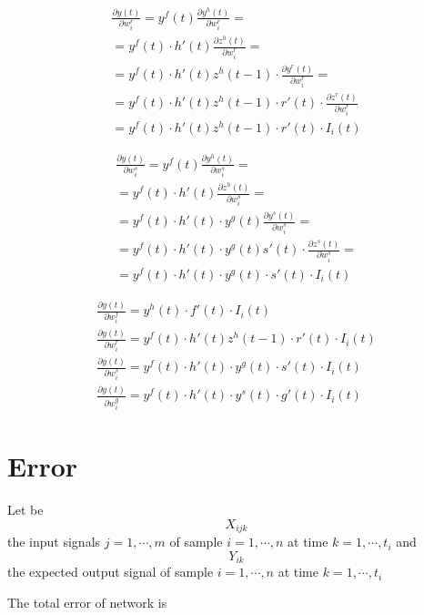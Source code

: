 \documentclass[a4paper,11pt]{article}
\begin{document}
\[
\begin{array}{c}
	\frac{\partial y(t)}{\partial w^r_i} = y^f(t) \frac{\partial y^h(t)}{\partial w^r_i} =
\\
	= y^f(t) \cdot h'(t) \frac{\partial z^h(t)}{\partial w^r_i} = 
\\
	= y^f(t) \cdot h'(t) z^h(t-1) \cdot \frac{\partial y^r(t)}{\partial w^r_i} = 
\\
	= y^f(t) \cdot h'(t) z^h(t-1) \cdot r'(t) \cdot \frac{\partial z^r(t)}{\partial w^r_i}
\\
	= y^f(t) \cdot h'(t) z^h(t-1) \cdot r'(t) \cdot I_i(t)
\end{array}
\]

\[
\begin{array}{c}
	\frac{\partial y(t)}{\partial w^s_i} = y^f(t) \frac{\partial y^h(t)}{\partial w^s_i} =
\\
	= y^f(t) \cdot h'(t) \frac{\partial z^h(t)}{\partial w^s_i} = 
\\
	= y^f(t) \cdot h'(t) \cdot y^g(t) \frac{\partial y^s(t)}{\partial w^s_i} = 
\\
	= y^f(t) \cdot h'(t) \cdot y^g(t) s'(t) \cdot \frac{\partial z^s(t)}{\partial w^s_i} = 
\\
	= y^f(t) \cdot h'(t) \cdot y^g(t) \cdot s'(t) \cdot I_i(t)
\end{array}
\]

\begin{eqnarray}
	\frac{\partial y(t)}{\partial w^f_i} = y^h(t) \cdot f'(t) \cdot I_i(t)
\\
	\frac{\partial y(t)}{\partial w^r_i} = y^f(t) \cdot h'(t) z^h(t-1) \cdot r'(t) \cdot I_i(t)
\\
	\frac{\partial y(t)}{\partial w^s_i} = y^f(t) \cdot h'(t) \cdot y^g(t) \cdot s'(t) \cdot I_i(t)
\\
	\frac{\partial y(t)}{\partial w^g_i} = y^f(t) \cdot h'(t) \cdot y^s(t) \cdot g'(t) \cdot I_i(t)
\end{eqnarray}


\section{Error}

Let be \[ X_{ijk} \] the input signals $ j = 1, \cdots, m$ of sample $ i = 1, \cdots, n$ at time $ k = 1, \cdots, t_i$ and \[ Y_{ik} \] the expected output signal of sample $ i = 1, \cdots, n$ at time $ k = 1, \cdots, t_i$

The total error of network is
\end{document}
